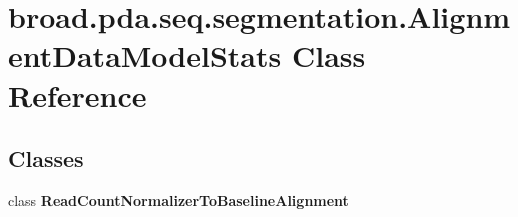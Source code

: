 \hypertarget{classbroad_1_1pda_1_1seq_1_1segmentation_1_1_alignment_data_model_stats}{\section{broad.\+pda.\+seq.\+segmentation.\+Alignment\+Data\+Model\+Stats Class Reference}
\label{classbroad_1_1pda_1_1seq_1_1segmentation_1_1_alignment_data_model_stats}
}
\subsection*{Classes}
\begin{DoxyCompactItemize}
\item 
class {\bfseries Read\+Count\+Normalizer\+To\+Baseline\+Alignment}
\end{DoxyCompactItemize}
